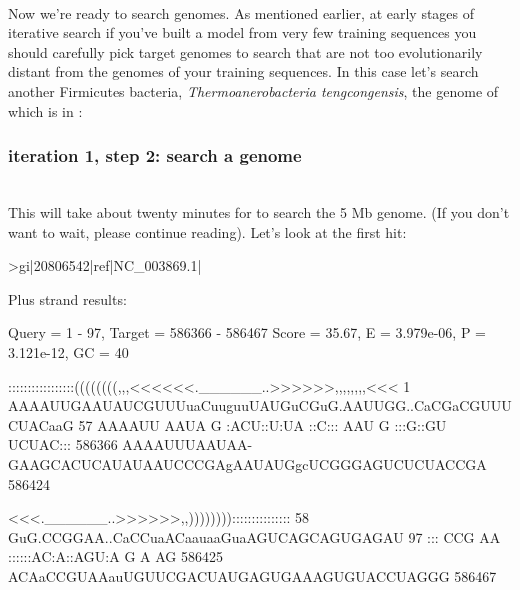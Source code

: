 \\

Now we're ready to search genomes. As mentioned earlier, at early
stages of iterative search if you've built a model from very few
training sequences you should carefully pick target genomes to search that are
not too evolutionarily distant from the genomes of your training
sequences. In this case let's search another Firmicutes bacteria,
\emph{Thermoanerobacteria tengcongensis}, the genome of which is in \newline
{}:

\subsubsection{iteration 1, step 2: search a genome}

\\

This will take about twenty minutes for  to search the 5 Mb
genome. (If you don't want to wait, please continue reading).
Let's look at the first hit:

{\samepage
\begin{sreoutput}
>gi|20806542|ref|NC_003869.1|

  Plus strand results:

 Query = 1 - 97, Target = 586366 - 586467
 Score = 35.67, E = 3.979e-06, P = 3.121e-12, GC =  40

           :::::::::::::::::((((((((,,,<<<<<<.______..>>>>>>,,,,,,,,<<<
         1 AAAAUUGAAUAUCGUUUuaCuuguuUAUGuCGuG.AAUUGG..CaCGaCGUUUCUACaaG 57      
           AAAAUU AAUA  G   :ACU::U:UA ::C::: AAU  G  :::G::GU UCUAC:::
    586366 AAAAUUUAAUAA-GAAGCACUCAUAUAAUCCCGAgAAUAUGgcUCGGGAGUCUCUACCGA 586424  

           <<<.______..>>>>>>,,)))))))):::::::::::::::
        58 GuG.CCGGAA..CaCCuaACaauaaGuaAGUCAGCAGUGAGAU 97      
           ::: CCG AA  ::::::AC:A::AGU:A    G A   AG  
    586425 ACAaCCGUAAauUGUUCGACUAUGAGUGAAAGUGUACCUAGGG 586467  
\end{sreoutput}
}

